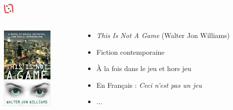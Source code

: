 \documentclass[slidetop,11pt]{beamer}
\def\moreInFrameTitleLeftt{\includegraphics[height=0.5cm]{img/ligueludique-0.png}~~~~~}
\begin{document}
\subsubsection{\sectionPartIIaVI}
\begin{frame}
	\frametitle{\moreInFrameTitleLeftt \sectionPartIIaVI }
	\begin{columns}[T]
		\begin{column}[T]{4.1cm}
			\includegraphics[height=4.05cm]{img/thisIsNotAGameWJW.jpg}
		\end{column}
		\begin{column}[T]{7cm}
			 \begin{beamerboxesrounded}	[lower=substructureRED, %
							 upper=block title RED,%
							 shadow=true]%
				   {\sectionPartIIaVI}
				\begin{itemize}
					\item \emph{This Is Not A Game} (Walter Jon Williams)
					\item Fiction contemporaine
					\item {\`A} la fois dans le jeu et hors jeu
					\item En Fran\c{c}ais : \emph{Ceci n'est pas un jeu}
					\item ...
				\end{itemize}
			\end{beamerboxesrounded}
		\end{column}
	\end{columns}
\end{frame} 

\def\sectionPartIIaVII{The Web Soap}
\end{document}
